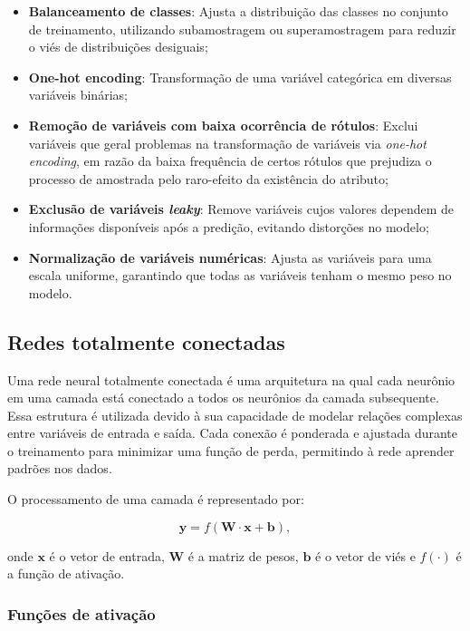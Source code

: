 \documentclass[
  onecolumn]{article}
\providecommand{\tightlist}{%
  \setlength{\itemsep}{0pt}\setlength{\parskip}{0pt}}\usepackage{longtable,booktabs,array}
\begin{document}
\begin{itemize}
\tightlist
\item
  \textbf{Balanceamento de classes}: Ajusta a distribuição das classes
  no conjunto de treinamento, utilizando subamostragem ou
  superamostragem para reduzir o viés de distribuições desiguais;
\item
  \textbf{One-hot encoding}: Transformação de uma variável categórica em
  diversas variáveis binárias;
\item
  \textbf{Remoção de variáveis com baixa ocorrência de rótulos}: Exclui
  variáveis que geral problemas na transformação de variáveis via
  \emph{one-hot encoding}, em razão da baixa frequência de certos
  rótulos que prejudiza o processo de amostrada pelo raro-efeito da
  existência do atributo;
\item
  \textbf{Exclusão de variáveis \emph{leaky}}: Remove variáveis cujos
  valores dependem de informações disponíveis após a predição, evitando
  distorções no modelo;
\item
  \textbf{Normalização de variáveis numéricas}: Ajusta as variáveis para
  uma escala uniforme, garantindo que todas as variáveis tenham o mesmo
  peso no modelo.
\end{itemize}

\subsection{Redes totalmente
conectadas}\label{redes-totalmente-conectadas}

Uma rede neural totalmente conectada é uma arquitetura na qual cada
neurônio em uma camada está conectado a todos os neurônios da camada
subsequente. Essa estrutura é utilizada devido à sua capacidade de
modelar relações complexas entre variáveis de entrada e saída. Cada
conexão é ponderada e ajustada durante o treinamento para minimizar uma
função de perda, permitindo à rede aprender padrões nos dados.

O processamento de uma camada é representado por:

\[\mathbf{y} = f(\mathbf{W} \cdot \mathbf{x} + \mathbf{b}),\]

onde \(\mathbf{x}\) é o vetor de entrada, \(\mathbf{W}\) é a matriz de
pesos, \(\mathbf{b}\) é o vetor de viés e \(f(\cdot)\) é a função de
ativação.

\subsubsection{Funções de
ativação}\label{funuxe7uxf5es-de-ativauxe7uxe3o}
\end{document}

